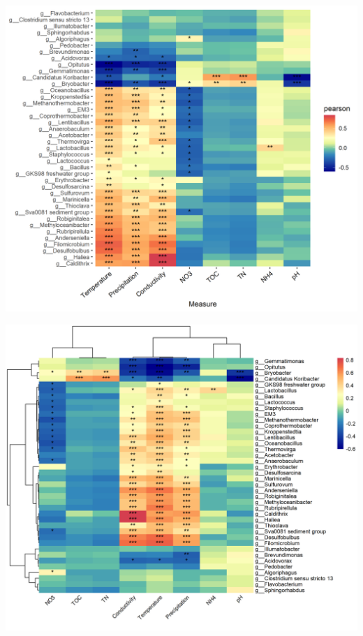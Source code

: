 \documentclass[
]{book}
\newenvironment{Shaded}{\begin{snugshade}}{\end{snugshade}}
\newcommand{\AttributeTok}[1]{\textcolor[rgb]{0.77,0.63,0.00}{#1}}
\newcommand{\CommentTok}[1]{\textcolor[rgb]{0.56,0.35,0.01}{\textit{#1}}}
\newcommand{\ConstantTok}[1]{\textcolor[rgb]{0.00,0.00,0.00}{#1}}
\newcommand{\FunctionTok}[1]{\textcolor[rgb]{0.00,0.00,0.00}{#1}}
\newcommand{\NormalTok}[1]{#1}
\newcommand{\SpecialCharTok}[1]{\textcolor[rgb]{0.00,0.00,0.00}{#1}}
\begin{document}
\begin{center}\includegraphics[width=700px]{Images/plot_corr_ggplot} \end{center}

\begin{Shaded}
\end{Shaded}

\begin{center}\includegraphics[width=700px]{Images/plot_corr_pheatmap} \end{center}
\end{document}
